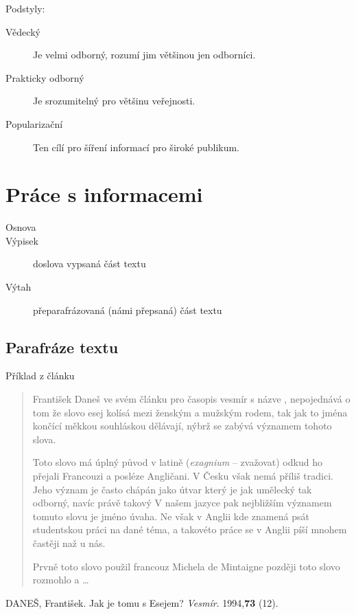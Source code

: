 \documentclass[10pt,a4page,headings,openany,%
oneside
,twocolumn
]{report}
\begin{document}
Podstyly:
\begin{description}
\item[Vědecký]Je velmi odborný, rozumí jim většinou jen odborníci.
\item[Prakticky odborný]Je srozumitelný pro většinu veřejnosti.
\item[Popularizační] Ten cílí pro šíření informací pro široké publikum.
\end{description}

\section{Práce s informacemi}

\begin{description}
\item[Osnova]
\item[Výpisek] doslova vypsaná část textu
\item[Výtah] přeparafrázovaná (námi přepsaná) část textu
\end{description}

\subsection{Parafráze textu}

Příklad z článku \cite{esej}

\begin{quotation}

František Daneš ve svém článku pro časopis vesmír\cite{esej} s názve \emph{}, nepojednává o tom že slovo esej kolísá mezi ženským a mužským rodem, tak jak to jména končící měkkou souhláskou dělávají, nýbrž se zabývá významem tohoto slova.

Toto slovo má úplný původ v latině (\textit{exagnium} -- zvažovat) odkud ho přejali Francouzi a posléze Angličani. V Česku však nemá příliš tradici. Jeho význam je často chápán jako útvar který je jak umělecký tak odborný, navíc právě takový V našem jazyce pak nejbližším významem tomuto slovu je jméno úvaha. Ne však v Anglii kde  znamená psát studentskou práci na dané téma, a takovéto práce se v Anglii píší mnohem častěji naž u nás.

Prvně toto slovo použil francouz Michela de Mintaigne později toto slovo rozmohlo a \dots 
\end{quotation}

\begin{thebibliography}{9}

 DANEŠ, František. Jak je tomu s Esejem? \textit{Vesmír}. 1994,\textbf{73} (12).

\end{thebibliography}
\end{document}
